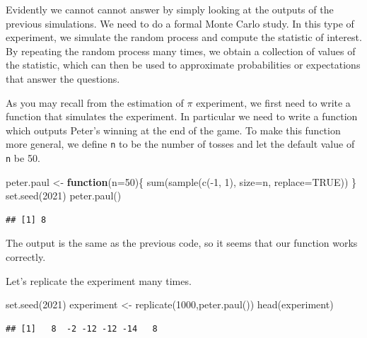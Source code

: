 \documentclass[
]{book}
\newenvironment{Shaded}{\begin{snugshade}}{\end{snugshade}}
\newcommand{\AttributeTok}[1]{\textcolor[rgb]{0.77,0.63,0.00}{#1}}
\newcommand{\ConstantTok}[1]{\textcolor[rgb]{0.00,0.00,0.00}{#1}}
\newcommand{\ControlFlowTok}[1]{\textcolor[rgb]{0.13,0.29,0.53}{\textbf{#1}}}
\newcommand{\DecValTok}[1]{\textcolor[rgb]{0.00,0.00,0.81}{#1}}
\newcommand{\FunctionTok}[1]{\textcolor[rgb]{0.00,0.00,0.00}{#1}}
\newcommand{\NormalTok}[1]{#1}
\newcommand{\OtherTok}[1]{\textcolor[rgb]{0.56,0.35,0.01}{#1}}
\newcommand{\SpecialCharTok}[1]{\textcolor[rgb]{0.00,0.00,0.00}{#1}}
\begin{document}
Evidently we cannot cannot answer by simply looking at the outputs of the previous simulations. We need to do a formal Monte Carlo study. In this type of experiment, we simulate the random process and compute the statistic of interest. By repeating the random process many times, we obtain a collection of values of the statistic, which can then be used to approximate probabilities or expectations that answer the questions.

As you may recall from the estimation of \(\pi\) experiment, we first need to write a function that simulates the experiment. In particular we need to write a function which outputs Peter's winning at the end of the game. To make this function more general, we define \texttt{n} to be the number of tosses and let the default value of \texttt{n} be 50.

\begin{Shaded}
\begin{Highlighting}[]
\NormalTok{peter.paul }\OtherTok{\textless{}{-}} \ControlFlowTok{function}\NormalTok{(}\AttributeTok{n=}\DecValTok{50}\NormalTok{)\{}
  \FunctionTok{sum}\NormalTok{(}\FunctionTok{sample}\NormalTok{(}\FunctionTok{c}\NormalTok{(}\SpecialCharTok{{-}}\DecValTok{1}\NormalTok{, }\DecValTok{1}\NormalTok{), }\AttributeTok{size=}\NormalTok{n, }\AttributeTok{replace=}\ConstantTok{TRUE}\NormalTok{))}
\NormalTok{\}}
\FunctionTok{set.seed}\NormalTok{(}\DecValTok{2021}\NormalTok{)}
\FunctionTok{peter.paul}\NormalTok{()}
\end{Highlighting}
\end{Shaded}

\begin{verbatim}
## [1] 8
\end{verbatim}

The output is the same as the previous code, so it seems that our function works correctly.

Let's replicate the experiment many times.

\begin{Shaded}
\begin{Highlighting}[]
\FunctionTok{set.seed}\NormalTok{(}\DecValTok{2021}\NormalTok{)}
\NormalTok{experiment }\OtherTok{\textless{}{-}} \FunctionTok{replicate}\NormalTok{(}\DecValTok{1000}\NormalTok{,}\FunctionTok{peter.paul}\NormalTok{())}
\FunctionTok{head}\NormalTok{(experiment)}
\end{Highlighting}
\end{Shaded}

\begin{verbatim}
## [1]   8  -2 -12 -12 -14   8
\end{verbatim}
\end{document}
